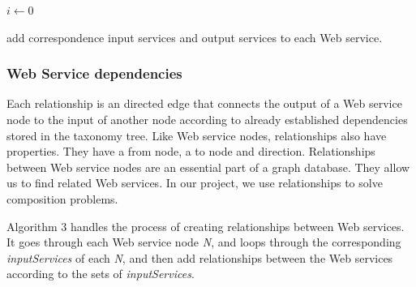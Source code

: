 \begin{algorithm}[H]
 \LinesNumbered
 \SetNlSty{}{}{:}
 $i \leftarrow 0$\;
 
 \caption{\footnotesize add correspondence input services and output services to each Web service.}
\label{generation}
\end{algorithm}


\subsubsection {Web Service dependencies}
Each relationship is an directed edge that connects the output of a Web service node to the input of another node according to already established dependencies stored in the taxonomy tree. Like Web service nodes, relationships also have properties. They have a from node, a to node and direction. Relationships between Web service nodes are an essential part of a graph database. They allow us to find related Web services. In our project, we use relationships to solve composition problems. \par
Algorithm 3 handles the process of creating relationships between Web services. It goes through each Web service node \emph{N}, and loops through the corresponding \emph{inputServices} of each \emph{N}, and then add relationships between the Web services according to the sets of \emph{inputServices}.\\


